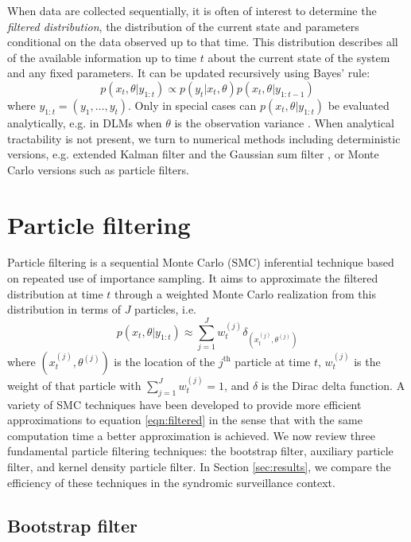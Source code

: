 \documentclass{elsarticle}
\begin{document}
When data are collected sequentially, it is often of interest to determine the \emph{filtered distribution}, the distribution of the current state and parameters conditional on the data observed up to that time. This distribution describes all of the available information up to time $t$ about the current state of the system and any fixed parameters. It can be updated recursively using Bayes' rule:
\begin{equation}
p(x_t,\theta| y_{1:t}) \propto p(y_t|x_t,\theta)p(x_t,\theta|y_{1:t-1}) \label{eqn:filtered}
\end{equation}
where $y_{1:t} = (y_1,\ldots,y_t)$. Only in special cases can $p(x_t,\theta| y_{1:t})$ be evaluated analytically, e.g. in DLMs when $\theta$ is the observation variance \cite[Sec 4.3,][]{petris2009dynamic}. When analytical tractability is not present, we turn to numerical methods including deterministic versions, e.g. extended Kalman filter and the Gaussian sum filter \citep{Alsp:Sore:nonl:1972}, or Monte Carlo versions such as particle filters.

\section{Particle filtering \label{sec:filtering}}

Particle filtering is a sequential Monte Carlo (SMC) inferential technique based on repeated use of importance sampling. It aims to approximate the filtered distribution at time $t$ through a weighted Monte Carlo realization from this distribution in terms of $J$ particles, i.e.
\begin{equation}
p(x_t,\theta| y_{1:t}) \approx \sum_{j=1}^J w_t^{(j)} \delta_{\left(x_t^{(j)},\theta^{(j)}\right)} \label{eqn:approx}
\end{equation}
where $\left(x_t^{(j)},\theta^{(j)}\right)$ is the location of the $j^{\mbox{th}}$ particle at time $t$, $w_t^{(j)}$ is the weight of that particle with $\sum_{j=1}^J w_t^{(j)}=1$, and $\delta$ is the Dirac delta function. A variety of SMC techniques have been developed to provide more efficient approximations to equation \eqref{eqn:filtered} in the sense that with the same computation time a better approximation is achieved. We now review three fundamental particle filtering techniques: the bootstrap filter, auxiliary particle filter, and kernel density particle filter. In Section \ref{sec:results}, we compare the efficiency of these techniques in the syndromic surveillance context.

\subsection{Bootstrap filter \label{sec:bf}}
\end{document}
